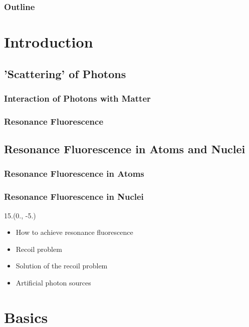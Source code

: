 \documentclass{beamer}
\begin{document}
\begin{frame}
    \titlepage
\end{frame}

\begin{frame}
    \frametitle{Outline}
    \tableofcontents
\end{frame}

\section{Introduction}

\subsection{'Scattering' of Photons}

\begin{frame}
    \frametitle{Interaction of Photons with Matter}
\end{frame}

\begin{frame}
    \frametitle{Resonance Fluorescence}
    
\end{frame}

\subsection{Resonance Fluorescence in Atoms and Nuclei}

\begin{frame}
    \frametitle{Resonance Fluorescence in Atoms}
    
\end{frame}

\begin{frame}
    \frametitle{Resonance Fluorescence in Nuclei}
    \begin{textblock}{15.}(0., -5.)
        \begin{itemize}
            \item How to achieve resonance fluorescence
            \item Recoil problem
            \item Solution of the recoil problem
            \item Artificial photon sources
        \end{itemize}
    \end{textblock}
\end{frame}

\section{Basics}
\end{document}
